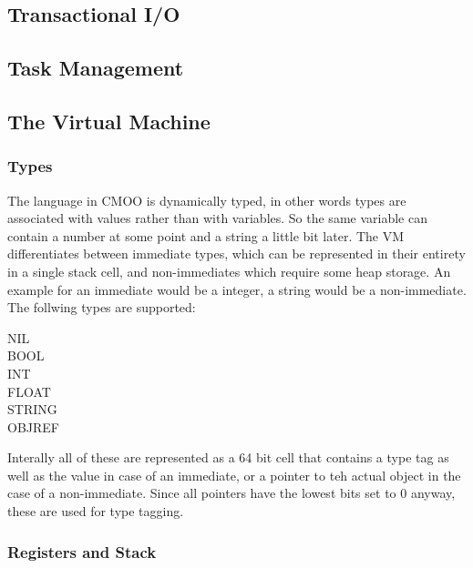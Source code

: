 \documentclass[12pt,a4paper]{article}
\begin{document}
\subsection{Transactional I/O}\label{sec:transactional_io}

\subsection{Task Management}\label{sec:task_mgmt}

\subsection{The Virtual Machine}\label{sec:virtual_machine}

\subsubsection{Types}\label{sec:types}

The language in CMOO is dynamically typed, in other words types are associated with values rather than with variables. So the same variable can contain a number at some point and a string a little bit later. The VM differentiates between immediate types, which can be represented in their entirety in a single stack cell, and non-immediates which require some heap storage. An example for an immediate would be a integer, a string would be a non-immediate. The follwing types are supported:

\begin{description}
\item[NIL]
\item[BOOL]
\item[INT]
\item[FLOAT]
\item[STRING]
\item[OBJREF]
\end{description}

Interally all of these are represented as a 64 bit cell that contains a type tag as well as the value in case of an immediate, or a pointer to teh actual object in the case of a non-immediate. Since all pointers have the lowest bits set to 0 anyway, these are used for type tagging.

\subsubsection{Registers and Stack}\label{sec:stack}
\end{document}

